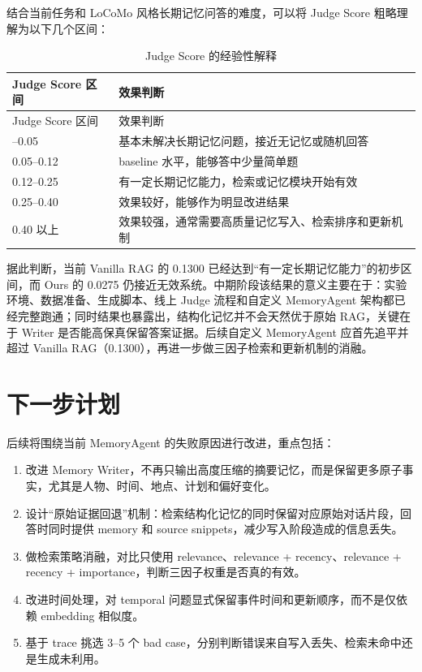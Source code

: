 \documentclass[UTF8,a4paper,11pt]{ctexart}
\begin{document}
结合当前任务和 LoCoMo 风格长期记忆问答的难度，可以将 Judge Score 粗略理解为以下几个区间：

\begin{longtable}{L{3.0cm}L{9.5cm}}
\caption{Judge Score 的经验性解释}\\
\toprule
Judge Score 区间 & 效果判断 \\
\midrule
\endfirsthead
\toprule
Judge Score 区间 & 效果判断 \\
\midrule
\endhead
\midrule
\endfoot
\bottomrule
{}--0.05 & 基本未解决长期记忆问题，接近无记忆或随机回答 \\
0.05--0.12 & baseline 水平，能够答中少量简单题 \\
0.12--0.25 & 有一定长期记忆能力，检索或记忆模块开始有效 \\
0.25--0.40 & 效果较好，能够作为明显改进结果 \\
0.40 以上 & 效果较强，通常需要高质量记忆写入、检索排序和更新机制 \\
\end{longtable}

据此判断，当前 Vanilla RAG 的 0.1300 已经达到“有一定长期记忆能力”的初步区间，而 Ours 的 0.0275 仍接近无效系统。中期阶段该结果的意义主要在于：实验环境、数据准备、生成脚本、线上 Judge 流程和自定义 MemoryAgent 架构都已经完整跑通；同时结果也暴露出，结构化记忆并不会天然优于原始 RAG，关键在于 Writer 是否能高保真保留答案证据。后续自定义 MemoryAgent 应首先追平并超过 Vanilla RAG（0.1300），再进一步做三因子检索和更新机制的消融。

\section{下一步计划}

后续将围绕当前 MemoryAgent 的失败原因进行改进，重点包括：

\begin{enumerate}
  \item 改进 Memory Writer，不再只输出高度压缩的摘要记忆，而是保留更多原子事实，尤其是人物、时间、地点、计划和偏好变化。
  \item 设计“原始证据回退”机制：检索结构化记忆的同时保留对应原始对话片段，回答时同时提供 memory 和 source snippets，减少写入阶段造成的信息丢失。
  \item 做检索策略消融，对比只使用 relevance、relevance + recency、relevance + recency + importance，判断三因子权重是否真的有效。
  \item 改进时间处理，对 temporal 问题显式保留事件时间和更新顺序，而不是仅依赖 embedding 相似度。
  \item 基于 trace 挑选 3--5 个 bad case，分别判断错误来自写入丢失、检索未命中还是生成未利用。
\end{enumerate}
\end{document}
